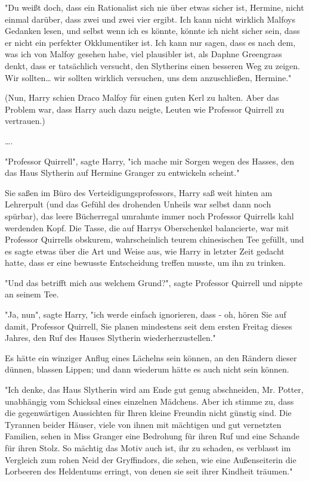 {"Du weißt doch, dass ein Rationalist sich nie über etwas sicher ist, Hermine, nicht einmal darüber, dass zwei und zwei vier ergibt. Ich kann nicht wirklich Malfoys Gedanken lesen, und selbst wenn ich es könnte, könnte ich nicht sicher sein, dass er nicht ein perfekter Okklumentiker ist. Ich kann nur sagen, dass es nach dem, was ich von Malfoy gesehen habe, viel plausibler ist, als Daphne Greengrass denkt, dass er tatsächlich versucht, den Slytherins einen besseren Weg zu zeigen. Wir sollten… wir sollten wirklich versuchen, uns dem anzuschließen, Hermine."

(Nun, Harry schien Draco Malfoy für einen guten Kerl zu halten. Aber das Problem war, dass Harry auch dazu neigte, Leuten wie Professor Quirrell zu vertrauen.)

….

"Professor Quirrell", sagte Harry, "ich mache mir Sorgen wegen des Hasses, den das Haus Slytherin auf Hermine Granger zu entwickeln scheint."

Sie saßen im Büro des Verteidigungsprofessors, Harry saß weit hinten am Lehrerpult (und das Gefühl des drohenden Unheils war selbst dann noch spürbar), das leere Bücherregal umrahmte immer noch Professor Quirrells kahl werdenden Kopf. Die Tasse, die auf Harrys Oberschenkel balancierte, war mit Professor Quirrells obskurem, wahrscheinlich teurem chinesischen Tee gefüllt, und es sagte etwas über die Art und Weise aus, wie Harry in letzter Zeit gedacht hatte, dass er eine bewusste Entscheidung treffen musste, um ihn zu trinken.

"Und das betrifft mich aus welchem Grund?", sagte Professor Quirrell und nippte an seinem Tee.

"Ja, nun", sagte Harry, "ich werde einfach ignorieren, dass - oh, hören Sie auf damit, Professor Quirrell, Sie planen mindestens seit dem ersten Freitag dieses Jahres, den Ruf des Hauses Slytherin wiederherzustellen."

Es hätte ein winziger Anflug eines Lächelns sein können, an den Rändern dieser dünnen, blassen Lippen; und dann wiederum hätte es auch nicht sein können.

"Ich denke, das Haus Slytherin wird am Ende gut genug abschneiden, Mr. Potter, unabhängig vom Schicksal eines einzelnen Mädchens. Aber ich stimme zu, dass die gegenwärtigen Aussichten für Ihren kleine Freundin nicht günstig sind. Die Tyrannen beider Häuser, viele von ihnen mit mächtigen und gut vernetzten Familien, sehen in Miss Granger eine Bedrohung für ihren Ruf und eine Schande für ihren Stolz. So mächtig das Motiv auch ist, ihr zu schaden, es verblasst im Vergleich zum rohen Neid der Gryffindors, die sehen, wie eine Außenseiterin die Lorbeeren des Heldentums erringt, von denen sie seit ihrer Kindheit träumen."

}
